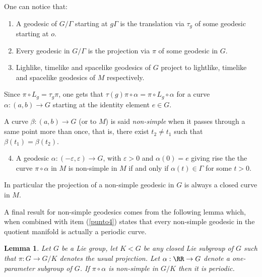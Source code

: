 \documentclass[12pt]{amsart}
\theoremstyle{plain}
\newtheorem{lem}[thm]{Lemma}
\theoremstyle{definition}
\theoremstyle{remark}
\begin{document}
One can notice that: 
	
	\begin{enumerate}
		\item A geodesic of $G/\Gamma$ starting at $g\Gamma$ is the translation via $\tau_g$ of some geodesic starting at $o$. \label{punto1}
		\item Every geodesic in $G/\Gamma$ is the projection via $\pi$ of some geodesic in $G$.\label{punto2}
		\item Lighlike, timelike and spacelike geodesics of $G$ project to lightlike, timelike and spacelike geodesics of $M$ respectively.
	\end{enumerate}
	
Since $\pi \circ L_g = \tau_g \pi$, one gets that $\tau(g)\pi\circ \alpha=\pi\circ L_g \circ \alpha$ for a curve $\alpha:(a,b)\to G$ starting at the identity element  $e\in G$. 

	 A curve $\beta:(a,b)\to G$ (or to $M$) is said {\em non-simple } when it passes through a same point more than once, that is, there exist $t_2\neq  t_1$ such that $\beta(t_1)=\beta(t_2)$. %
	\begin{enumerate}
		\setcounter{enumi}{3}
		
		\item A geodesic $\alpha: (-\varepsilon, \varepsilon) \to G$, with $\varepsilon>0$ and   $\alpha(0)=e$   giving rise the the curve $\pi\circ \alpha$ in $M$  is non-simple in $M$ if and only if  $\alpha(t) \in \Gamma$ for some $t>0$.\label{punto4}
	\end{enumerate}
	In particular the projection of a non-simple geodesic in $G$ is always a closed curve in $M$.
	

	
	A final result for non-simple geodesics comes from the following lemma which, when combined with item (\ref{punto4}) states that every non-simple geodesic in the quotient manifold is actually a periodic curve. 
	
	\begin{lem}\cite{BOV}  Let $G$ be a Lie group, let $K < G$ be any closed Lie  subgroup of $G$ such that  $\pi: G \to G/K$ denotes the 
		usual projection. Let $\alpha: \RR \to G$ denote a  one-parameter subgroup of $G$.
		If $\pi \circ \alpha$ is non-simple in $G/K$ then it is periodic.
	\end{lem}
	
\end{document}
